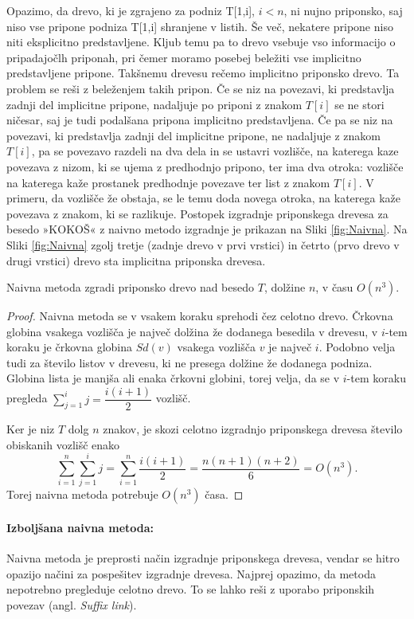 Opazimo, da drevo, ki  je zgrajeno za podniz T[1,i], $i< n$, ni nujno priponsko, saj niso vse pripone podniza T[1,i] shranjene v listih. Še več, nekatere pripone niso niti eksplicitno predstavljene. Kljub temu pa to drevo vsebuje vso informacijo o pripadajočlh priponah, pri čemer moramo posebej beležiti vse implicitno predstavljene pripone. Takšnemu drevesu rečemo implicitno priponsko drevo. Ta problem se reši z beleženjem takih pripon. Če se niz na povezavi, ki predstavlja zadnji del implicitne pripone, nadaljuje po priponi z znakom $T[i]$ se ne stori ničesar, saj je tudi podalšana pripona implicitno predstavljena. Če pa se niz na povezavi, ki predstavlja zadnji del implicitne pripone, ne nadaljuje z znakom $T[i]$, pa se povezavo razdeli na dva dela in se ustavri vozlišče, na katerega kaze povezava z nizom, ki se ujema z predhodnjo pripono, ter ima dva otroka: vozlišče na katerega kaže prostanek predhodnje povezave ter list z znakom $T[i]$. V primeru, da vozlišče že obstaja, se le temu doda novega otroka, na katerega kaže povezava z znakom, ki se razlikuje. Postopek izgradnje priponskega drevesa za besedo »KOKOŠ« z naivno metodo izgradnje je prikazan na Sliki \ref{fig:Naivna}. Na Sliki \ref{fig:Naivna} zgolj tretje (zadnje drevo v prvi vrstici) in četrto (prvo drevo v drugi vrstici) drevo sta implicitna priponska drevesa.

\begin{izr}\label{izr:naivna}
    Naivna metoda zgradi priponsko drevo nad besedo $T$, dolžine $n$, v času $O(n^3)$.
\end{izr}

\begin{proof}
    Naivna metoda se v vsakem koraku sprehodi čez celotno drevo. Črkovna globina vsakega vozlišča je največ dolžina že dodanega besedila v drevesu, v $i$-tem koraku je črkovna globina $\textit{Sd}(v)$ vsakega vozlišča $v$ je največ $i$. Podobno velja tudi za število listov v drevesu, ki ne presega dolžine že dodanega podniza. Globina lista je manjša ali enaka črkovni globini, torej velja, da se v $i$-tem koraku pregleda $\sum_{j=1}^i j=\dfrac{i(i+1)}{2}$ vozlišč.

    Ker je niz $T$ dolg $n$ znakov, je skozi celotno izgradnjo priponskega drevesa število obiskanih vozlišč enako
    $$
        \sum_{i=1}^n \sum_{j=1}^i j=\sum_{i=1}^n \dfrac{i(i+1)}{2}=\dfrac{n(n+1)(n+2)}{6}=O(n^3).
    $$
    Torej naivna metoda potrebuje $O(n^3)$ časa.
\end{proof}

\paragraph{Izboljšana naivna metoda:}
Naivna metoda je preprosti način izgradnje priponskega drevesa, vendar se hitro opazijo načini za pospešitev izgradnje drevesa. Najprej opazimo, da metoda nepotrebno pregleduje celotno drevo. To se lahko reši z uporabo priponskih povezav (angl. \textit{Suffix link}).

